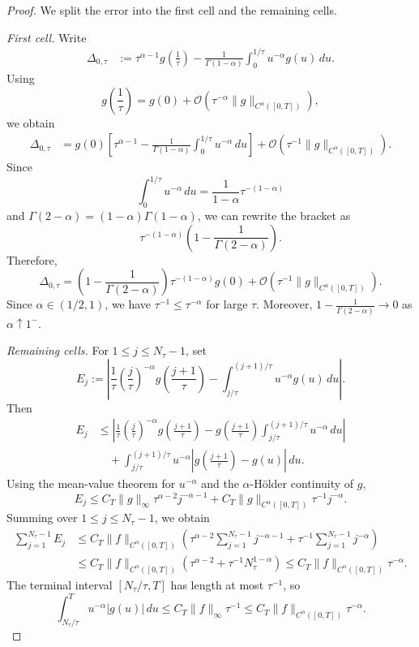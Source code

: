 \documentclass[letterpaper]{article}
\numberwithin{equation}{section}
\theoremstyle{definition}
\theoremstyle{remark}
\begin{document}
\begin{proof}
We split the error into the first cell and the remaining cells.

\medskip
\noindent
\emph{First cell.}
Write
\begin{align*}
  \Delta_{0,\tau}
  &:=
  \tau^{\alpha-1}g\!\left(\frac1\tau\right)
  -
  \frac{1}{\Gamma(1-\alpha)}
  \int_0^{1/\tau}u^{-\alpha}g(u)\,du.
\end{align*}
Using
\[
g\!\left(\frac1\tau\right)=g(0)+\mathcal O\!\left(\tau^{-\alpha}\|g\|_{C^\alpha([0,T])}\right),
\]
we obtain
\begin{align*}
  \Delta_{0,\tau}
  &=
  g(0)\left[
    \tau^{\alpha-1}
    -
    \frac{1}{\Gamma(1-\alpha)}
    \int_0^{1/\tau}u^{-\alpha}\,du
  \right]
  +\mathcal O\left(\tau^{-1}\|g\|_{C^\alpha([0,T])}\right).
\end{align*}
Since
\[
\int_0^{1/\tau}u^{-\alpha}\,du
  =
  \frac{1}{1-\alpha}\tau^{-(1-\alpha)}
\]
and
$\Gamma(2-\alpha)=(1-\alpha)\Gamma(1-\alpha)$,
we can rewrite the bracket as
\[
\tau^{-(1-\alpha)}
  \left(
    1-\frac{1}{\Gamma(2-\alpha)}
  \right).
\]
Therefore,
\begin{equation}\label{eq:first-cell-mainterm}
  \Delta_{0,\tau}
  =
  \left(
    1-\frac{1}{\Gamma(2-\alpha)}
  \right)\tau^{-(1-\alpha)}g(0)
  +
  \mathcal O\left(\tau^{-1}\|g\|_{C^\alpha([0,T])}\right).
\end{equation}
Since $\alpha\in(1/2,1)$, we have $\tau^{-1}\le\tau^{-\alpha}$ for large $\tau$. Moreover,
$1-\frac{1}{\Gamma(2-\alpha)}
  \to0$
as $\alpha\uparrow1^-$.

\medskip
\noindent
\emph{Remaining cells.}
For $1\le j\le N_\tau-1$, set
\[
  E_j:=
  \left|
    \frac1\tau\left(\frac{j}{\tau}\right)^{-\alpha}g\!\left(\frac{j+1}{\tau}\right)
    -
    \int_{j/\tau}^{(j+1)/\tau}u^{-\alpha}g(u)\,du
  \right|.
\]
Then
\begin{align*}
  E_j
  &\le
  \left|
    \frac1\tau\left(\frac{j}{\tau}\right)^{-\alpha}g\!\left(\frac{j+1}{\tau}\right)
    -
    g\!\left(\frac{j+1}{\tau}\right)
    \int_{j/\tau}^{(j+1)/\tau}u^{-\alpha}\,du
  \right|
  \\
  &\quad+
  \int_{j/\tau}^{(j+1)/\tau}
  u^{-\alpha}
  \left|g\!\left(\frac{j+1}{\tau}\right)-g(u)\right|\,du.
\end{align*}
Using the mean-value theorem for $u^{-\alpha}$ and the $\alpha$-H\"older continuity of $g$,
\[
  E_j
  \le
  C_T\|g\|_{\infty}\tau^{\alpha-2}j^{-\alpha-1}
  +
  C_T\|g\|_{C^\alpha([0,T])}\tau^{-1}j^{-\alpha}.
\]
Summing over $1\le j\le N_\tau-1$, we obtain
\begin{align}
  \sum_{j=1}^{N_\tau-1}E_j
  &\le
  C_T\|f\|_{C^\alpha([0,T])}
  \left(
    \tau^{\alpha-2}\sum_{j=1}^{N_\tau-1}j^{-\alpha-1}
    +
    \tau^{-1}\sum_{j=1}^{N_\tau-1}j^{-\alpha}
  \right)
  \nonumber\\
  &\le
  C_T\|f\|_{C^\alpha([0,T])}
  \left(
    \tau^{\alpha-2}
    +\tau^{-1}N_\tau^{1-\alpha}
  \right)
  \le
  C_T\|f\|_{C^\alpha([0,T])}\tau^{-\alpha}.
  \label{eq:Ej-sum-bound}
\end{align}
The terminal interval $[N_\tau/\tau,T]$ has length at most $\tau^{-1}$, so
\[
  \int_{N_\tau/\tau}^T u^{-\alpha}|g(u)|\,du
  \le C_T\|f\|_\infty \tau^{-1}
  \le C_T\|f\|_{C^\alpha([0,T])}\tau^{-\alpha}.
\]


\end{proof}
\end{document}
